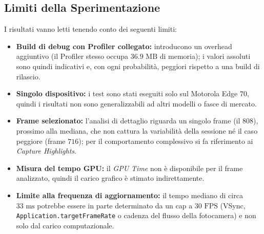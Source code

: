 \subsection{Limiti della Sperimentazione}
I risultati vanno letti tenendo conto dei seguenti limiti:
\begin{itemize}
\item \textbf{Build di debug con Profiler collegato:} introducono un overhead aggiuntivo (il Profiler stesso occupa $36.9\text{ MB}$ di memoria); i valori assoluti sono quindi indicativi e, con ogni probabilità, peggiori rispetto a una build di rilascio.
\item \textbf{Singolo dispositivo:} i test sono stati eseguiti solo sul Motorola Edge 70, quindi i risultati non sono generalizzabili ad altri modelli o fasce di mercato.
\item \textbf{Frame selezionato:} l'analisi di dettaglio riguarda un singolo frame (il $808$), prossimo alla mediana, che non cattura la variabilità della sessione né il caso peggiore (frame $716$); per il comportamento complessivo si fa riferimento ai \textit{Capture Highlights}.
\item \textbf{Misura del tempo GPU:} il \textit{GPU Time} non è disponibile per il frame analizzato, quindi il carico grafico è stimato indirettamente.
\item \textbf{Limite alla frequenza di aggiornamento:} il tempo mediano di circa $33\text{ ms}$ potrebbe essere in parte determinato da un cap a $30\text{ FPS}$ (VSync, \texttt{Application.\allowbreak targetFrameRate} o cadenza del flusso della fotocamera) e non solo dal carico computazionale.
\end{itemize}











